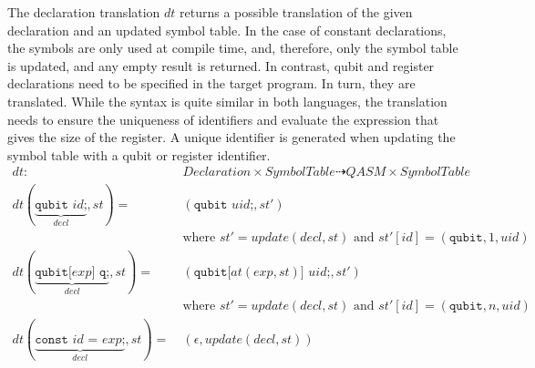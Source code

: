 The declaration translation $dt$ returns a possible translation of the given declaration and an updated symbol table. In the case of constant declarations, the symbols are only used at compile time, and, therefore, only the symbol table is updated, and any empty result is returned. In contrast, qubit and register declarations need to be specified in the target program. In turn, they are translated. While the syntax is quite similar in both languages, the translation needs to ensure the uniqueness of identifiers and evaluate the expression that gives the size of the register. A unique identifier is generated when updating the symbol table with a qubit or register identifier.
\begin{align*}
    dt : \ & Declaration \times SymbolTable \dashrightarrow QASM \times SymbolTable\\
    dt(\underbrace{\texttt{qubit } id \text{;}}_{decl}, st) = \ & (\texttt{qubit } uid\texttt{;}, st')\\
                                                                & \text{where } st' = update(decl, st) \text{ and } st'[id] = (\texttt{qubit}, 1, uid)\\
    dt(\underbrace{\texttt{qubit[} exp \texttt{] q;}}_{decl}, st) = \ & (\texttt{qubit[} at(exp, st) \texttt{] } uid\texttt{;}, st')\\
                                                                & \text{where } st' = update(decl, st) \text{ and } st'[id] = (\texttt{qubit}, n, uid)\\
    dt(\underbrace{\texttt{const } id \texttt{ = } exp \texttt{;}}_{decl}, st) = \ & (\epsilon, update(decl, st))
\end{align*}

